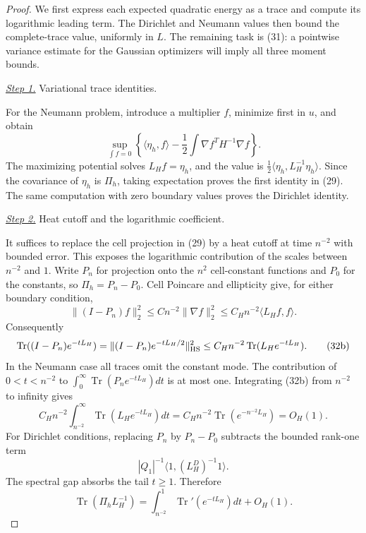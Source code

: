 \documentclass{aomart}
\theoremstyle{definition}
\newcommand{\1}{\mathbf 1}
\begin{document}
\begin{proof}
We first express each expected quadratic energy as a trace and compute
its logarithmic leading term.  The Dirichlet and Neumann values then
bound the complete-trace value, uniformly in $L$.  The remaining task
is (31): a pointwise variance estimate for the Gaussian optimizers
will imply all three moment bounds.

\smallskip\noindent
\underline{\textit{Step 1.}} Variational trace identities.

For the Neumann problem, introduce a multiplier $f$, minimize first in
$u$, and obtain
\begin{equation*}
\sup_ {\int f=0}\left\{\langle\eta_ h,f\rangle
-\frac12\int\nabla f^TH^{-1}\nabla f\right\}.
\end{equation*}
The maximizing potential solves $L_Hf=\eta_h$, and the value is
$\frac12\langle\eta_h,L_H^{-1}\eta_h\rangle$.  Since the covariance
of $\eta_h$ is $\Pi_h$, taking expectation proves the first identity
in (29).  The same computation with zero boundary values proves the
Dirichlet identity.

\smallskip\noindent
\underline{\textit{Step 2.}} Heat cutoff and the logarithmic coefficient.

It suffices to replace the cell projection in (29) by a heat cutoff at
time $n^{-2}$ with bounded error.  This exposes the logarithmic
contribution of the scales between $n^{-2}$ and $1$.
Write $P_n$ for projection onto the $n^2$ cell-constant functions and
$P_0$ for the constants, so $\Pi_h=P_n-P_0$.  Cell Poincare and
ellipticity give, for either boundary condition,
\begin{equation}
\|(I-P_ n)f\|_ 2^2\leq Cn^{-2}\|\nabla f\|_ 2^2
\leq C_ Hn^{-2}\langle L_ Hf,f\rangle.
\tag{32a}
\end{equation}
Consequently
\begin{equation}
\operatorname {Tr}((I-P_ n)e^{-tL_ H})
=\|(I-P_ n)e^{-tL_ H/2}\|_ {\rm HS}^2
\leq C_ Hn^{-2}\operatorname {Tr}(L_ He^{-tL_ H}).
\tag{32b}
\end{equation}
In the Neumann case all traces omit the constant mode.  The contribution
of $0<t<n^{-2}$ to
$\int_ 0^\infty\operatorname {Tr}(P_ ne^{-tL_ H})dt$ is at most one.
Integrating (32b) from $n^{-2}$ to infinity gives
\begin{equation}
C_ Hn^{-2}\int_ {n^{-2}}^\infty
\operatorname {Tr}(L_ He^{-tL_ H})dt
=C_ Hn^{-2}\operatorname {Tr}(e^{-n^{-2}L_ H})=O_ H(1).
\tag{32c}
\end{equation}
For Dirichlet conditions, replacing $P_n$ by $P_n-P_0$ subtracts the
bounded rank-one term
\[
|Q_1|^{-1}\langle1,(L_H^D)^{-1}1\rangle.
\]
The spectral gap absorbs the tail $t\geq1$.  Therefore
\begin{equation}
\operatorname {Tr}(\Pi_ hL_ H^{-1})
=\int_ {n^{-2}}^1\operatorname {Tr}'(e^{-tL_ H})dt+O_ H(1).
\tag{32d}
\end{equation}


\end{proof}
\end{document}
